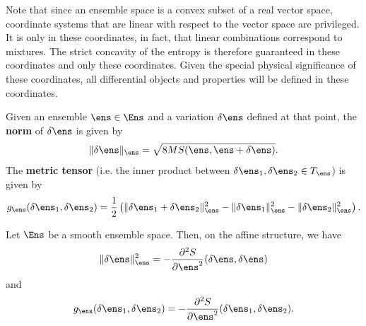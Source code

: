 \begin{mathSection}
\begin{remark}
	Note that since an ensemble space is a convex subset of a real vector space, coordinate systems that are linear with respect to the vector space are privileged. It is only in these coordinates, in fact, that linear combinations correspond to mixtures. The strict concavity of the entropy is therefore guaranteed in these coordinates and only these coordinates. Given the special physical significance of these coordinates, all differential objects and properties will be defined in these coordinates.
\end{remark}

\begin{defn}
	Given an ensemble $\ens \in \Ens$ and a variation $\delta \ens$ defined at that point, the \textbf{norm} of $\delta \ens$ is given by
	$$ \lVert \delta \ens \rVert_{\ens} = \sqrt{ 8 MS(\ens, \ens + \delta \ens) }.$$
	The \textbf{metric tensor} (i.e. the inner product between $\delta \ens_1 , \delta \ens_2 \in T_{\ens}$) is given by
	$$ g_{\ens}( \delta \ens_1, \delta \ens_2 ) = \frac{1}{2} \left( \lVert \delta \ens_1 + \delta \ens_2 \rVert_{\ens}^2 - \lVert \delta \ens_1 \rVert_{\ens}^2 - \lVert \delta \ens_2 \rVert_{\ens}^2 \right).$$
\end{defn}

\begin{thrm}
	Let $\Ens$ be a smooth ensemble space. Then, on the affine structure, we have
	$$ \lVert \delta \ens \rVert_{\ens}^2 = - \frac{\partial^2 S}{\partial \ens^2}(\delta \ens , \delta \ens) $$
	and 
	$$ g_{\ens}( \delta \ens_1, \delta \ens_2 ) = - \frac{\partial^2 S}{\partial \ens ^2}( \delta \ens_1, \delta \ens_2 ).$$
\end{thrm}


\end{mathSection}
